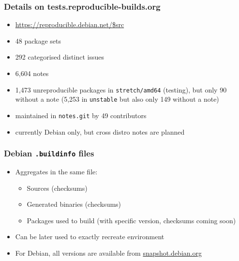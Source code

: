 \documentclass[14pt,aspectratio=169]{beamer}
\begin{document}
\begin{frame}
 \frametitle{Details on tests.reproducible-builds.org}

 \begin{itemize}
  \item \url{https://reproducible.debian.net/$src}
  \item 48 package sets 
  \item 292 categorised distinct issues
  \item 6,604 notes
  \item 1,473 unreproducible packages in \texttt{stretch/amd64} (testing), but only
  90 without a note (5,253 in \texttt{unstable} but also only 149 without a
  note)
  \item maintained in \texttt{notes.git} by 49 contributors
  \item currently Debian only, but cross distro notes are planned
 \end{itemize}
\end{frame}


\begin{frame}
 \frametitle{Debian \texttt{.buildinfo} files}

 \begin{itemize}
  \item Aggregates in the same file:
   \begin{itemize}
    \item Sources (checksums)
    \item Generated binaries (checksums)
    \item Packages used to build (with specific version, checksums coming soon)
   \end{itemize}
  \item Can be later used to exactly recreate environment
  \item For Debian, all versions are available from \url{snapshot.debian.org}
 \end{itemize}
\end{frame}
\end{document}
